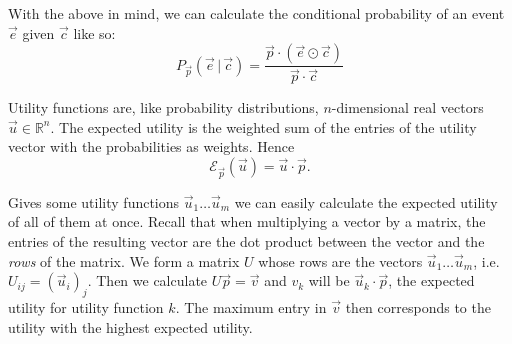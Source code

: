 \documentclass[a4paper]{exam}
\begin{document}
With the above in mind, we can calculate the conditional probability of an event $\vec{e}$ given $\vec{c}$ like so:
\[
  P_{\vec{p}} (\vec{e}\, |\, \vec{c})  = \frac{\vec{p} \cdot (\vec{e} \odot \vec{c})}{\vec{p} \cdot \vec{c}}
\]

Utility functions are, like probability distributions, $n$-dimensional real vectors $\vec{u} \in \mathbb{R}^n$.  The expected utility is the weighted sum of the entries of the utility vector with the probabilities as weights.  Hence 
\[\mathcal{E}_{\vec{p}}(\vec{u}) = \vec{u} \cdot \vec{p}.\]

Gives some utility functions $\vec{u}_1 \dots \vec{u}_m$ we can easily calculate the expected utility of all of them at once.  Recall that when multiplying a vector by a matrix, the entries of the resulting vector are the dot product between the vector and the \emph{rows} of the matrix. We form a matrix $U$ whose rows are the vectors $\vec{u}_1 \dots \vec{u}_m$, i.e. $U_{ij} = (\vec{u}_i)_j$.  Then we calculate $U \vec{p} = \vec{v}$ and $v_k$ will be $\vec{u}_k \cdot \vec{p}$, the expected utility for utility function $k$.  The maximum entry in $\vec{v}$ then corresponds to the utility with the highest expected utility.
\end{document}
